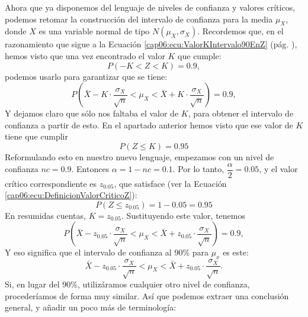 Ahora que ya disponemos del lenguaje de niveles de confianza y valores
críticos, podemos retomar la construcción del intervalo de confianza para la
media $\mu_X$, donde $X$ es una variable normal de tipo $N(\mu_X,\sigma_X)$.
Recordemos que, en el razonamiento que sigue a la Ecuación
\ref{cap06:ecu:ValorKIntervalo90EnZ} (pág.
\pageref{cap06:ecu:ValorKIntervalo90EnZ}), hemos visto que una vez encontrado
el valor $K$ que cumple:
    \[P(-K< Z <K)=0.9,\]
podemos usarlo para garantizar que se tiene:
    \[
    P\left(\bar X-K\cdot\dfrac{\sigma_X}{\sqrt{n}}< \mu_X<
    \bar X+K\cdot\dfrac{\sigma_X}{\sqrt{n}}\right)=0.9,
    \]
Y dejamos claro que sólo nos faltaba el valor de $K$, para obtener el intervalo
de confianza a partir de esto. En el apartado anterior hemos visto que ese
valor de $K$ tiene que cumplir
    \[P(Z\leq K)=0.95\]
Reformulando esto en nuestro nuevo lenguaje, empezamos con un nivel de
confianza $nc=0.9$. Entonces $\alpha=1-nc=0.1$. Por lo tanto,
$\dfrac{\alpha}{2}=0.05$, y el valor crítico correspondiente es $z_{0.05}$, que
satisface (ver la Ecuación \ref{cap06:ecu:DefinicionValorCriticoZ}):
    \[P(Z\leq z_{0.05})=1-0.05=0.95\]
En resumidas cuentas, $K=z_{0.05}$. Sustituyendo este valor, tenemos
    \[
    P\left(\bar X-z_{0.05}\cdot\dfrac{\sigma_X}{\sqrt{n}}< \mu_X<
    \bar X+z_{0.05}\cdot\dfrac{\sigma_X}{\sqrt{n}}\right)=0.9,
    \]
Y eso significa que el intervalo de confianza al 90\% para $\mu_x$ es este:
    \[
    \bar X-z_{0.05}\cdot\dfrac{\sigma_X}{\sqrt{n}}< \mu_X<
    \bar X+z_{0.05}\cdot\dfrac{\sigma_X}{\sqrt{n}}.
    \]
Si, en lugar del 90\%, utilizáramos cualquier otro nivel de confianza,
procederíamos de forma muy similar. Así que podemos extraer una conclusión
general, y añadir un poco más de terminología:
